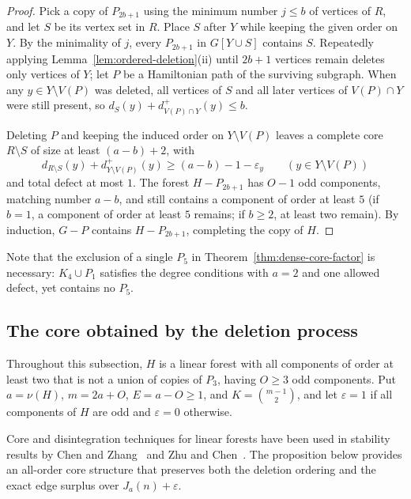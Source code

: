 \documentclass[10pt]{article}
\theoremstyle{compactplain}
\theoremstyle{remark}\newtheorem{remark}[theorem]{Remark}
\begin{document}
\begin{proof}
Pick a copy of $P_{2b+1}$ using the minimum number $j\le b$ of vertices
of $R$, and let $S$ be its vertex set in $R$. Place $S$ after $Y$ while
keeping the given order on $Y$. By the minimality of $j$, every
$P_{2b+1}$ in $G[Y\cup S]$ contains $S$. Repeatedly applying
Lemma~\ref{lem:ordered-deletion}(ii) until $2b+1$ vertices remain
deletes only vertices of $Y$; let $P$ be a Hamiltonian path of the
surviving subgraph. When any $y\in Y\setminus V(P)$ was deleted, all
vertices of $S$ and all later vertices of $V(P)\cap Y$ were still
present, so $d_S(y)+d_{V(P)\cap Y}^+(y)\le b$.

Deleting $P$ and keeping the induced order on $Y\setminus V(P)$ leaves a
complete core $R\setminus S$ of size at least $(a-b)+2$, with
\[
 d_{R\setminus S}(y)+d_{Y\setminus V(P)}^+(y)\ge(a-b)-1-\varepsilon_y
 \qquad(y\in Y\setminus V(P))
\]
and total defect at most $1$. The forest $H-P_{2b+1}$ has $O-1$ odd
components, matching number $a-b$, and still contains a component of
order at least $5$ (if $b=1$, a component of order at least $5$ remains;
if $b\ge2$, at least two remain). By induction, $G-P$ contains
$H-P_{2b+1}$, completing the copy of $H$.
\end{proof}

Note that the exclusion of a single $P_5$ in
Theorem~\ref{thm:dense-core-factor} is necessary: $K_4\cup P_1$
satisfies the degree conditions with $a=2$ and one allowed defect, yet
contains no $P_5$.

\subsection{The core obtained by the deletion process}

Throughout this subsection, $H$ is a linear forest with all components
of order at least two that is not a union of copies of $P_3$, having
$O\ge3$ odd components. Put $a=\nu(H)$, $m=2a+O$, $E=a-O\ge1$, and
$K=\binom{m-1}{2}$, and let $\varepsilon=1$ if all components of $H$ are
odd and $\varepsilon=0$ otherwise.

Core and disintegration techniques for linear forests have been used in
stability results by Chen and Zhang~\cite{ChenZhang} and Zhu and
Chen~\cite{ZhuChen}. The proposition below provides an all-order core
structure that preserves both the deletion ordering and the exact edge
surplus over $J_a(n)+\varepsilon$.
\end{document}
